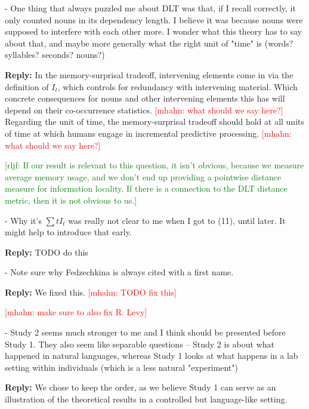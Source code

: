 \documentclass{article}[11pt,a4paper,oneside]
\newcommand\mhahn[1]{\textcolor{red}{[mhahn: #1]}}
\newcommand\rljf[1]{\textcolor{green}{[rljf: #1]}}
\newenvironment{reply}
  {\par\medskip
   \color{blue}%
   \begin{framed}
   \textbf{Reply: }\ignorespaces}
 {\end{framed}
  \medskip}
\begin{document}
- One thing that always puzzled me about DLT was that, if I recall correctly, it only counted nouns in its dependency length. I believe it was because nouns were supposed to interfere with each other more. I wonder what this theory has to say about that, and maybe more generally what the right unit of "time" is (words? syllables? seconds? nouns?)

\begin{reply}
In the memory-surprisal tradeoff, intervening elements come in via the definition of $I_t$, which controls for redundancy with intervening material.
Which concrete consequences for nouns and other intervening elements this has will depend on their co-occurrence statistics.
	\mhahn{what should we say here?}
Regarding the unit of time, the memory-surprisal tradeoff should hold at all units of time at which humans engage in incremental predictive processing.
	\mhahn{what should we say here?}
	
	\rljf{If our result is relevant to this question, it isn't obvious, because we measure average memory usage, and we don't end up providing a pointwise distance measure for information locality. If there is a connection to the DLT distance metric, then it is not obvious to us.}

\end{reply}

- Why it's $\sum t I_t$ was really not clear to me when I got to (11), until later. It might help to introduce that early.

\begin{reply}
	TODO do this
\end{reply}

- Note sure why Fedzechkina is always cited with a first name.

\begin{reply}
	We fixed this. \mhahn{TODO fix this}
	
	\mhahn{make sure to also fix R. Levy}
\end{reply}

- Study 2 seems much stronger to me and I think should be presented before Study 1. They also seem like separable questions -- Study 2 is about what happened in natural languages, whereas Study 1 looks at what happens in a lab setting within individuals (which is a less natural "experiment")

\begin{reply}
We chose to keep the order, as we believe Study 1 can serve as an illustration of the theoretical results in a controlled but language-like setting.
\end{reply}
\end{document}
